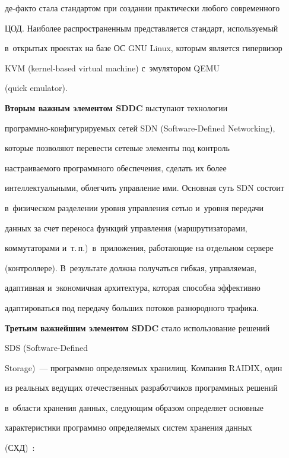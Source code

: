 де-факто стала стандартом при создании практически любого современного 


ЦОД. Наиболее распространенным представляется стандарт, используемый 


в~открытых проектах на базе ОС GNU Linux, которым является гипервизор 


KVM (kernel-based virtual machine) с~эмулятором QEMU


(quick emulator).





\textbf{Вторым важным элементом SDDC} выступают технологии 


программно-кон\-фи\-гу\-ри\-ру\-емых сетей SDN (Software-Defined Networking), 


которые позволяют перевести сетевые элементы под контроль 


настраиваемого программного обеспечения, сделать их более 


интеллектуальными, облегчить управление ими. Основная суть SDN состоит 


в~физическом разделении уровня управления сетью и~уровня передачи 


данных за счет переноса функций управления (маршрутизаторами, 


коммутаторами и~т.\,п.)\ в~приложения, работающие на отдельном сервере 


(контроллере). В~результате должна получаться гибкая, управляемая, 


адаптивная и~экономичная архитектура, которая способна эффективно 


адаптироваться под передачу больших потоков разнородного трафика.





\textbf{Третьим важнейшим элементом SDDC} стало использование решений 


SDS (Software-Defined  


Storage)~--- программно определяемых хранилищ. Компания RAIDIX, один 


из реальных ведущих отечественных разработчиков программных решений 


в~области хранения данных, следующим образом определяет основные 


характеристики программно определяемых систем хранения данных 


(СХД)~\cite{17-bs}:


